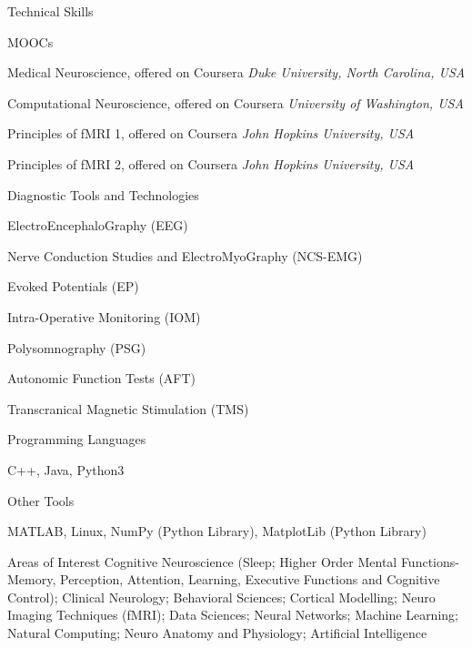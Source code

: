 \documentclass{resume} %
\begin{document}
\newpage

\begin{rSection}{Technical Skills}

\begin{rSubsection}{MOOCs}{}{}{}
\item Medical Neuroscience, offered on Coursera \hfill {\em Duke University, North Carolina, USA}
\item Computational Neuroscience, offered on Coursera \hfill {\em University of Washington, USA}
\item Principles of fMRI 1, offered on Coursera \hfill {\em John Hopkins University, USA}
\item Principles of fMRI 2, offered on Coursera \hfill {\em John Hopkins University, USA}
\end{rSubsection}

\begin{rSubsection}{Diagnostic Tools and Technologies}{}{}{}
\item ElectroEncephaloGraphy (EEG)
\item Nerve Conduction Studies and 
ElectroMyoGraphy (NCS-EMG)
\item Evoked Potentials (EP)
\item Intra-Operative Monitoring (IOM)
\item Polysomnography (PSG)
\item Autonomic Function Tests (AFT)
\item Transcranical Magnetic Stimulation (TMS)
\end{rSubsection}
\begin{rSubsection}{Programming Languages}{}{}{}
\item C++, Java, Python3
\end{rSubsection}
\begin{rSubsection}{Other Tools}{}{}{}
\item MATLAB, Linux, NumPy (Python Library), MatplotLib (Python Library)
\end{rSubsection}
\begin{rSubsection}{Areas of Interest}{}{}{}
Cognitive Neuroscience (Sleep; Higher Order Mental Functions- Memory, Perception, Attention, Learning, Executive Functions and Cognitive Control); Clinical Neurology; Behavioral Sciences; Cortical Modelling; Neuro Imaging Techniques (fMRI); Data Sciences; Neural Networks; Machine Learning; Natural Computing; Neuro Anatomy and Physiology; Artificial Intelligence
\end{rSubsection}

\end{rSection}
\end{document}
